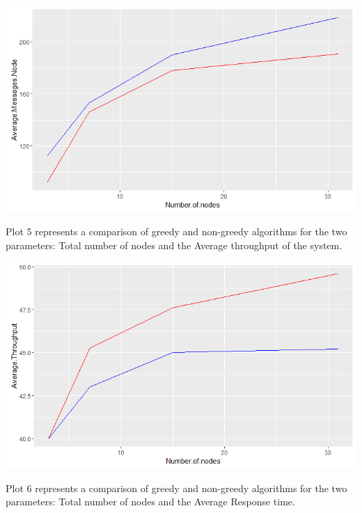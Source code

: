 \documentclass{article}
\begin{document}
\begin{center}
    \includegraphics[width=\textwidth]{figs/Plot4} \\
\end{center}

Plot 5 represents a comparison of greedy and non-greedy algorithms for the two parameters: Total number of nodes and the Average throughput of the system. \\

\begin{center}
    \includegraphics[width=\textwidth]{figs/Plot5} \\
\end{center}

Plot 6 represents a comparison of greedy and non-greedy algorithms for the two parameters: Total number of nodes and the Average Response time. \\
\end{document}
